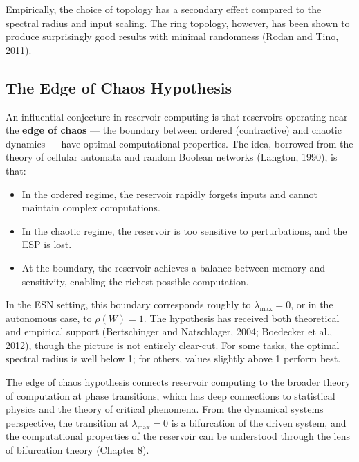Empirically, the choice of topology has a secondary effect compared to the spectral radius and input scaling. The ring topology, however, has been shown to produce surprisingly good results with minimal randomness (Rodan and Tino, 2011).

\subsection{The Edge of Chaos Hypothesis}\label{sec:14.4.5}

An influential conjecture in reservoir computing is that reservoirs operating near the \textbf{edge of chaos} --- the boundary between ordered (contractive) and chaotic dynamics --- have optimal computational properties. The idea, borrowed from the theory of cellular automata and random Boolean networks (Langton, 1990), is that:

\begin{itemize}[nosep]
  \item In the ordered regime, the reservoir rapidly forgets inputs and cannot maintain complex computations.
  \item In the chaotic regime, the reservoir is too sensitive to perturbations, and the ESP is lost.
  \item At the boundary, the reservoir achieves a balance between memory and sensitivity, enabling the richest possible computation.
\end{itemize}

In the ESN setting, this boundary corresponds roughly to $\lambda_{\max} = 0$, or in the autonomous case, to $\rho(W) = 1$. The hypothesis has received both theoretical and empirical support (Bertschinger and Natschlager, 2004; Boedecker et al., 2012), though the picture is not entirely clear-cut. For some tasks, the optimal spectral radius is well below 1; for others, values slightly above 1 perform best.

\begin{remark}
The edge of chaos hypothesis connects reservoir computing to the broader theory of computation at phase transitions, which has deep connections to statistical physics and the theory of critical phenomena. From the dynamical systems perspective, the transition at $\lambda_{\max} = 0$ is a bifurcation of the driven system, and the computational properties of the reservoir can be understood through the lens of bifurcation theory (Chapter 8).


\bigskip

\end{remark}


